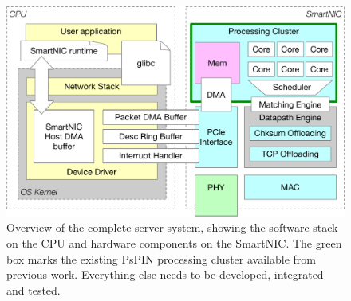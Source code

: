 \begin{figure}
    \centering
    \includegraphics[width=.9\linewidth]{figures/system-overview.pdf}
    \caption{Overview of the complete server system, showing the software stack on the CPU and hardware components on the SmartNIC.  The green box marks the existing PsPIN processing cluster available from previous work.  Everything else needs to be developed, integrated and tested.}
    \label{fig:full-system}
\end{figure}

